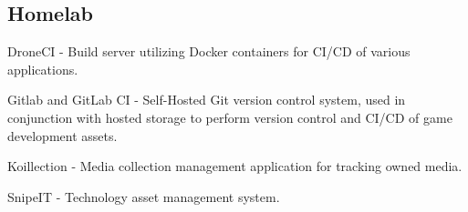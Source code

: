 \subsection{{Homelab \hfill}}
\begin{zitemize}
\item DroneCI - Build server utilizing Docker containers for CI/CD of various applications.
\item Gitlab and GitLab CI - Self-Hosted Git version control system, used in conjunction with hosted storage to perform version control and CI/CD of game development assets.
\item Koillection - Media collection management application for tracking owned media.
\item SnipeIT - Technology asset management system.
\end{zitemize}
